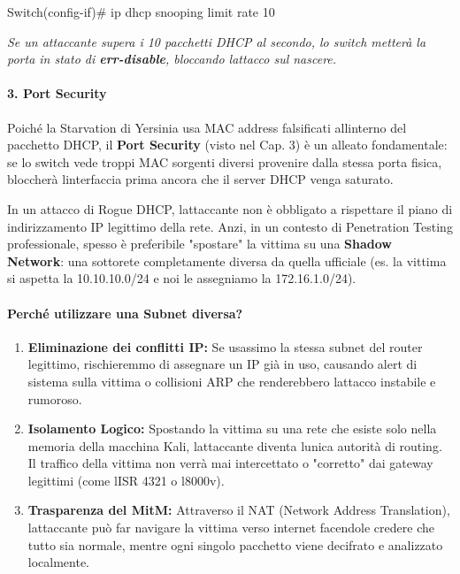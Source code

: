 \documentclass[11pt,a4paper]{article}
\begin{document}
Switch(config-if)\# ip dhcp snooping limit rate 10

\emph{Se un attaccante supera i 10 pacchetti DHCP al secondo, lo switch
metterà la porta in stato di \textbf{err-disable}, bloccando
l\textquotesingle attacco sul nascere.}

\paragraph{3. Port Security}\label{port-security}

Poiché la Starvation di Yersinia usa MAC address falsificati
all\textquotesingle interno del pacchetto DHCP, il \textbf{Port
Security} (visto nel Cap. 3) è un alleato fondamentale: se lo switch
vede troppi MAC sorgenti diversi provenire dalla stessa porta fisica,
bloccherà l\textquotesingle interfaccia prima ancora che il server DHCP
venga saturato.

In un attacco di Rogue DHCP, l\textquotesingle attaccante non è
obbligato a rispettare il piano di indirizzamento IP legittimo della
rete. Anzi, in un contesto di Penetration Testing professionale, spesso
è preferibile "spostare" la vittima su una \textbf{Shadow Network}: una
sottorete completamente diversa da quella ufficiale (es. la vittima si
aspetta la 10.10.10.0/24 e noi le assegniamo la 172.16.1.0/24).

\paragraph{Perché utilizzare una Subnet
diversa?}\label{perchuxe9-utilizzare-una-subnet-diversa}

\begin{enumerate}
\def\labelenumi{\arabic{enumi}.}
\item
  \textbf{Eliminazione dei conflitti IP:} Se usassimo la stessa subnet
  del router legittimo, rischieremmo di assegnare un IP già in uso,
  causando alert di sistema sulla vittima o collisioni ARP che
  renderebbero l\textquotesingle attacco instabile e rumoroso.
\item
  \textbf{Isolamento Logico:} Spostando la vittima su una rete che
  esiste solo nella memoria della macchina Kali,
  l\textquotesingle attaccante diventa l\textquotesingle unica autorità
  di routing. Il traffico della vittima non verrà mai intercettato o
  "corretto" dai gateway legittimi (come l\textquotesingle ISR 4321 o
  l\textquotesingle8000v).
\item
  \textbf{Trasparenza del MitM:} Attraverso il NAT (Network Address
  Translation), l\textquotesingle attaccante può far navigare la vittima
  verso internet facendole credere che tutto sia normale, mentre ogni
  singolo pacchetto viene decifrato e analizzato localmente.
\end{enumerate}
\end{document}
